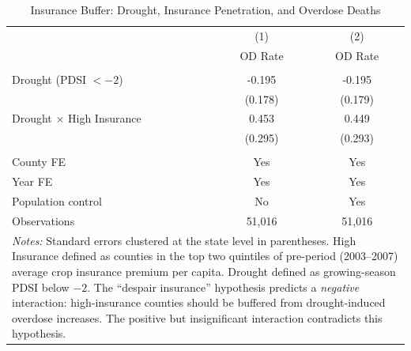 \begin{table}[t]
\centering
\caption{Insurance Buffer: Drought, Insurance Penetration, and Overdose Deaths}
\label{tab:triplediff}
\begin{tabular}{lcc}
\hline\hline
 & (1) & (2) \\
 & OD Rate & OD Rate \\
\hline
\\[-1.8ex]
Drought (PDSI $< -2$) & -0.195 & -0.195 \\
 & (0.178) & (0.179) \\
Drought $\times$ High Insurance & 0.453 & 0.449 \\
 & (0.295) & (0.293) \\
\\[-1.8ex]
\hline
County FE & Yes & Yes \\
Year FE & Yes & Yes \\
Population control & No & Yes \\
Observations & 51,016 & 51,016 \\
\hline\hline
\multicolumn{3}{p{0.85\textwidth}}{\footnotesize \textit{Notes:}
Standard errors clustered at the state level in parentheses.
High Insurance defined as counties in the top two quintiles of pre-period
(2003--2007) average crop insurance premium per capita. Drought defined as
growing-season PDSI below $-2$. The ``despair insurance'' hypothesis predicts
a \textit{negative} interaction: high-insurance counties should be buffered
from drought-induced overdose increases. The positive but insignificant
interaction contradicts this hypothesis.}
\end{tabular}
\end{table}
